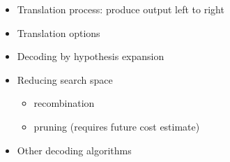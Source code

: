 \documentclass[landscape]{slides}
\begin{document}

\begin{itemize} \vspace{10mm}
\item Translation process: produce output left to right
\item Translation options
\item Decoding by hypothesis expansion
\item Reducing search space
\begin{itemize}
\item recombination
\item pruning (requires future cost estimate)
\end{itemize}
\item Other decoding algorithms
\end{itemize}

\end{document}
